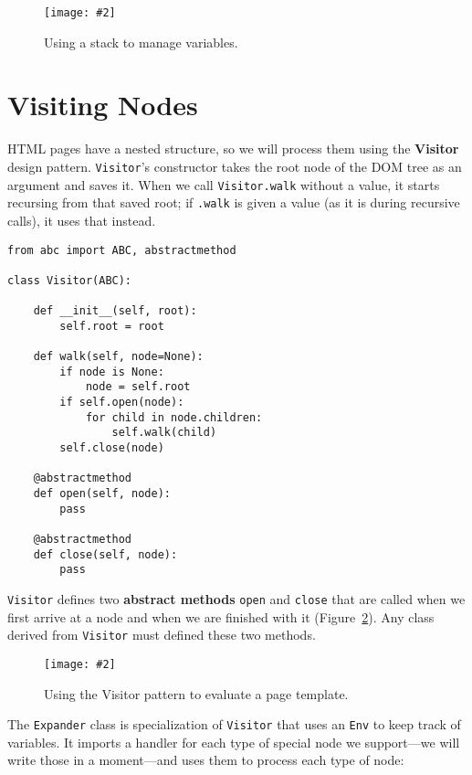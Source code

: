 \documentclass{scrbook}
\newcommand{\figref}[1]{Figure~\ref{#1}}
\newcommand{\figpdf}[4]{\begin{figure}%
\centering%
\texttt{[image: \#2]}%
\caption{#3}%
\label{#1}%
\end{figure}}
\newcommand{\glossref}[1]{\textbf{#1}}
\begin{document}
\figpdf{templating-stack}{./templating/stack.pdf}{Using a stack to manage variables.}{0.6}

\section{Visiting Nodes}\label{templating-nodes}


HTML pages have a nested structure,
so we will process them using
the \glossref{Visitor} design pattern.
\texttt{Visitor}'s constructor takes the root node of the DOM tree as an argument and saves it.
When we call \texttt{Visitor.walk} without a value,
it starts recursing from that saved root;
if \texttt{.walk} is given a value (as it is during recursive calls),
it uses that instead.


\begin{lstlisting}[frame=single,frameround=tttt]
from abc import ABC, abstractmethod

class Visitor(ABC):

    def __init__(self, root):
        self.root = root

    def walk(self, node=None):
        if node is None:
            node = self.root
        if self.open(node):
            for child in node.children:
                self.walk(child)
        self.close(node)

    @abstractmethod
    def open(self, node):
        pass

    @abstractmethod
    def close(self, node):
        pass
\end{lstlisting}



\noindent \texttt{Visitor} defines two \glossref{abstract methods} \texttt{open} and \texttt{close}
that are called when we first arrive at a node and when we are finished with it
(\figref{templating-visitor}).
Any class derived from \texttt{Visitor} must defined these two methods.

\figpdf{templating-visitor}{./templating/visitor.pdf}{Using the Visitor pattern to evaluate a page template.}{0.6}


The \texttt{Expander} class is specialization of \texttt{Visitor}
that uses an \texttt{Env} to keep track of variables.
It imports a handler
for each type of special node we support—we will write those in a moment—and
uses them to process each type of node:
\end{document}
